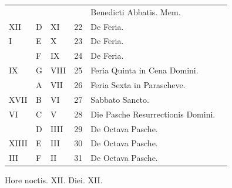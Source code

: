 \begin{center}
\begin{tabular}{l | l | l | r | l l}
 & & & & \quad \color{Red} Benedicti Abbatis. Mem. \\
\color{Red} XII & D & \color{Red} XI & 22 & De Feria. \\
\color{Red} I & E & \color{Red} X & 23 & De Feria. & \color{Red} \\
\color{Red}  & F & \color{Red} IX & 24 & De Feria. & \color{Red} \\
\color{Red} IX & G & \color{Red} VIII & 25 & \color{Red} Feria Quinta in Cena Domini. \\
\color{Red}  & \color{Red} A & \color{Red} VII & 26 & \color{Red} Feria Sexta in Parascheve. \\
\color{Red} XVII & B & \color{Red} VI & 27 & \color{Red} Sabbato Sancto. \\
\color{Red} VI & C & \color{Red} V & 28 & \color{Red} Die Pasche Resurrectionis Domini. \\
\color{Red}  & D & \color{Red} IIII & 29 & \color{Red} De Octava Pasche. \\
\color{Red} XIIII & E & \color{Red} III & 30 & \color{Red} De Octava Pasche. & \color{Red} \\
\color{Red} III & F & \color{Red} II & 31 & \color{Red} De Octava Pasche. & \color{Red} \\
\end{tabular}
\newline \color{Red} Hore noctis. XII. Diei. XII.
\end{center}


\newpage
\color{Red}\color{black}

